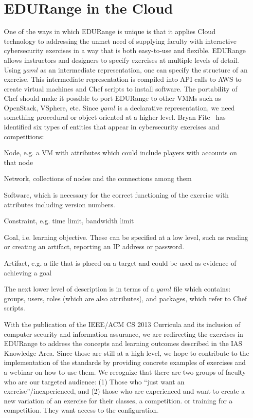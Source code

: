 \section*{EDURange in the Cloud}
One of the ways in which EDURange is unique is that it applies Cloud technology 
to addressing the unmet need of supplying faculty with interactive cybersecurity exercises 
in a way that is both easy-to-use and flexible.
EDURange allows instructors and designers to specify exercises at multiple levels of detail.
Using $yaml$ as an intermediate representation, one can specify the structure of an exercise.
This intermediate representation is compiled into API calls to AWS to create virtual machines and
Chef scripts to install software. The portability of Chef should make it possible to port EDURange to
other VMMs such as OpenStack, VSphere, etc.
Since $yaml$ is a declarative representation, 
we need something procedural or object-oriented  at a higher level.  Bryan Fite~\cite{fite_2013} has identified
six types of entities that appear in cybersecurity exercises and competitions:
\begin{packenum}
  \item Node, e.g.  a VM with attributes which  could include players with accounts on that node
  \item Network,  collections of nodes and the connections among them
  \item Software, which is necessary for the correct functioning of the exercise
    with attributes including version numbers.
  \item Constraint, e.g. time limit, bandwidth limit
  \item Goal, i.e. learning objective.  These can be specified at a low level, such as 
    reading or creating an artifact, reporting an IP address or password.
  \item Artifact, e.g. a file that is placed on a target and could be used as evidence of achieving a goal
\end{packenum}

The next lower level of description is in terms of a $yaml$ file which contains:
 groups, users, roles (which are also attributes), and packages, which refer to Chef scripts.


With the publication of the IEEE/ACM CS 2013 Curricula and its inclusion of computer security and 
information assurance, we are redirecting the exercises in EDURange to address the concepts and learning 
outcomes described in the IAS Knowledge Area.  Since those are still at a high level, we hope to contribute
to the implementation of the standards by providing concrete examples of exercises and a webinar
on how to use them.  We recognize that
there are two groups of faculty who are our targeted audience: (1) Those who ``just want an exercise''/inexperienced, 
and (2) those who are experienced and want to create a new variation of an exercise for
their classes, a competition.  or training for a competition.  They want access to the configuration.

